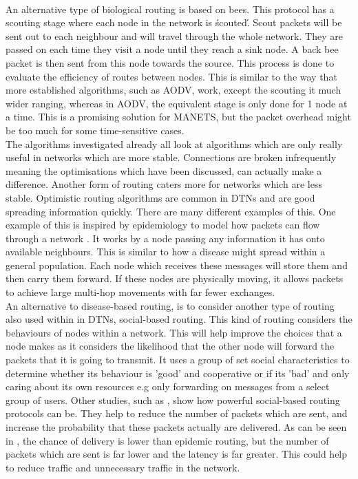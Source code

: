 \documentclass{report}
\begin{document}
\bigskip\\
An alternative type of biological routing is based on bees\cite{leonov2016modeling}. This protocol has a scouting stage where each node in the network is \'scouted\'. Scout packets will be sent out to each neighbour and will travel through the whole network. They are passed on each time they visit a node until they reach a sink node. A back bee packet is then sent from this node towards the source. This process is done to evaluate the efficiency of routes between nodes. This is similar to the way that more established algorithms, such as AODV, work, except the scouting it much wider ranging, whereas in AODV, the equivalent stage is only done for 1 node at a time. This is a promising solution for MANETS, but the packet overhead might be too much for some time-sensitive cases. 
\bigskip\\
The algorithms investigated already all look at algorithms which are only really useful in networks which are more stable. Connections are broken infrequently meaning the optimisations which have been discussed, can actually make a difference. Another form of routing caters more for networks which are less stable. Optimistic routing algorithms are common in DTNs and are good spreading information quickly. There are many different examples of this. One example of this is inspired by epidemiology to model how packets can flow through a network \cite{choksatid2016efficient, de2014modeling}. It works by a node passing any information it has onto available neighbours. This is similar to how a disease might spread within a general population. Each node which receives these messages will store them and then carry them forward. If these nodes are physically moving, it allows packets to achieve large multi-hop movements with far fewer exchanges. 
\bigskip\\
An alternative to disease-based routing, is to consider another type of routing also used within in DTNs, social-based routing\cite{zhu2012survey}. This kind of routing considers the behaviours of nodes within a network. This will help improve the choices that a node makes as it considers the likelihood that the other node will forward the packets that it is going to transmit. It uses a group of set social characteristics to determine whether its behaviour is 'good' and cooperative or if its 'bad' and only caring about its own resources e.g only forwarding on messages from a select group of users. Other studies, such as \cite{wong2015performance, zhu2013relative}, show how powerful social-based routing protocols can be. They help to reduce the number of packets which are sent, and increase the probability that these packets actually are delivered. As can be seen in \cite{zhu2013relative}, the chance of delivery is lower than epidemic routing, but the number of packets which are sent is far lower and the latency is far greater. This could help to reduce traffic and unnecessary traffic in the network.
\end{document}
